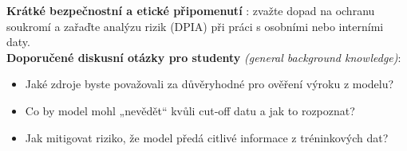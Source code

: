 \noindent\textbf{Krátké bezpečnostní a etické připomenutí} \cite{kb_malinka_chatgpt_ve_vyuce_dva_roky_pote_2024_pdf_90bc3aaf_page_12_1}: zvažte dopad na ochranu soukromí a zařaďte analýzu rizik (DPIA) při práci s osobními nebo interními daty.\\[6pt]
\noindent\textbf{Doporučené diskusní otázky pro studenty} \emph{(general background knowledge)}: \begin{itemize}
  \item Jaké zdroje byste považovali za důvěryhodné pro ověření výroku z modelu?
  \item Co by model mohl „nevědět“ kvůli cut‑off datu a jak to rozpoznat?
  \item Jak mitigovat riziko, že model předá citlivé informace z tréninkových dat?
\end{itemize}